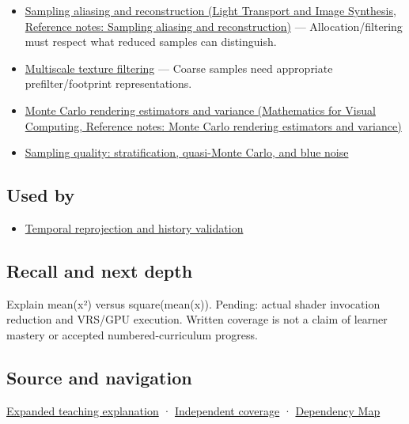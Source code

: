\begin{itemize}
\tightlist
\item
  \href{../04-Light-Transport-and-Image-Synthesis/main.pdf\#nameddest=appendix-6a7869dd79a6}{Sampling aliasing and reconstruction (Light Transport and Image Synthesis, Reference notes: Sampling aliasing and reconstruction)} --- Allocation/filtering must respect what reduced samples can distinguish.
\item
  \hyperref[appendix-b677a85ba76f]{Multiscale texture filtering} --- Coarse samples need appropriate prefilter/footprint representations.
\item
  \href{../02-Mathematics-for-Visual-Computing/main.pdf\#nameddest=appendix-031e02bf28af}{Monte Carlo rendering estimators and variance (Mathematics for Visual Computing, Reference notes: Monte Carlo rendering estimators and variance)}
\item
  \hyperref[appendix-9f693ffd82bc]{Sampling quality: stratification, quasi-Monte Carlo, and blue noise}
\end{itemize}

\subsection{Used by}\label{appendix-4192b2bdd21e-used-by}

\begin{itemize}
\tightlist
\item
  \hyperref[appendix-0727340a4428]{Temporal reprojection and history validation}
\end{itemize}

\subsection{Recall and next depth}\label{appendix-4192b2bdd21e-recall-and-next-depth}

Explain mean(x²) versus square(mean(x)). Pending: actual shader invocation reduction and VRS/GPU execution. Written coverage is not a claim of learner mastery or accepted numbered-curriculum progress.

\subsection{Source and navigation}\label{appendix-4192b2bdd21e-source-and-navigation}

\hyperref[04-visual-computing-ii-ch042-multiresolution-work-must-preserve-the-right-information]{Expanded teaching explanation} · \hyperref[appendix-fd090d982a15-xr01---independent-seeing-and-representation-source]{Independent coverage} · \hyperref[appendix-4ad47bdd269a]{Dependency Map}

